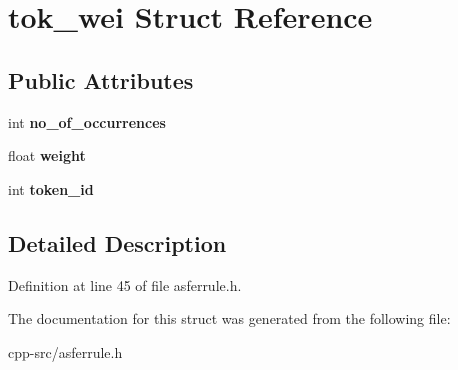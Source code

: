 \hypertarget{structtok__wei}{\section{tok\-\_\-wei Struct Reference}
\label{structtok__wei}
}
\subsection*{Public Attributes}
\begin{DoxyCompactItemize}
\item 
\hypertarget{structtok__wei_ab6a9908d335718e55cd0d021cc4294fe}{int {\bfseries no\-\_\-of\-\_\-occurrences}}\label{structtok__wei_ab6a9908d335718e55cd0d021cc4294fe}

\item 
\hypertarget{structtok__wei_ac0f8997b02f10bcdd74d095a5e98e432}{float {\bfseries weight}}\label{structtok__wei_ac0f8997b02f10bcdd74d095a5e98e432}

\item 
\hypertarget{structtok__wei_a5bdabf06f64d580612b982f161d14e77}{int {\bfseries token\-\_\-id}}\label{structtok__wei_a5bdabf06f64d580612b982f161d14e77}

\end{DoxyCompactItemize}


\subsection{Detailed Description}


Definition at line 45 of file asferrule.\-h.



The documentation for this struct was generated from the following file\-:\begin{DoxyCompactItemize}
\item 
cpp-\/src/asferrule.\-h\end{DoxyCompactItemize}
